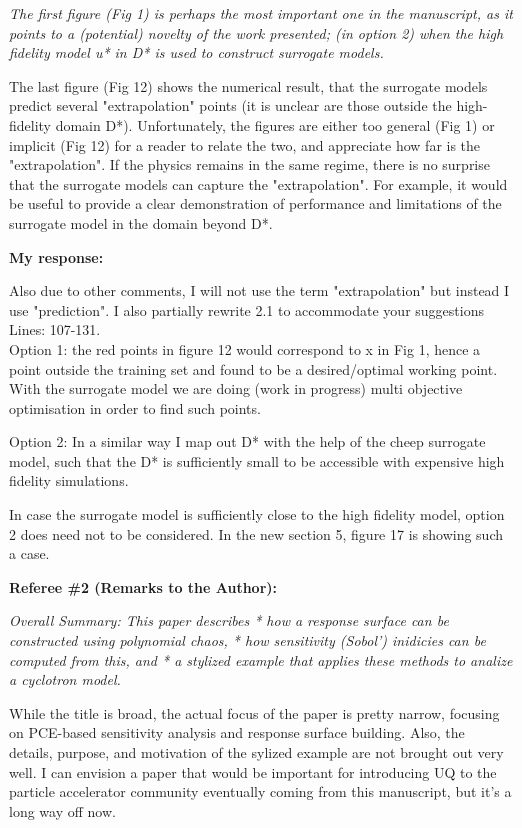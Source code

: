 \documentclass{article}
\newcommand{\atline}[1]{\color{red} Lines: #1\color{blue}}
\begin{document}
{\it  The first figure (Fig 1) is perhaps the most important one in the manuscript, as it points to a (potential) novelty of the work presented; (in option 2) when the high fidelity model u* in D* is used to construct surrogate models. 

The last figure (Fig 12) shows the numerical result, that the surrogate models predict several "extrapolation" points (it is unclear are those outside the high-fidelity domain D*). Unfortunately, the figures are either too general (Fig 1) or implicit (Fig 12) for a reader to relate the two, and appreciate how far is the "extrapolation". If the physics remains in the same regime, there is no surprise that the surrogate models can capture the "extrapolation". For example, it would be useful to provide a clear demonstration of performance and limitations of the surrogate model in the domain beyond D*. }

{\bf My response: }{\color{blue}  Also due to other comments, I will not use the term "extrapolation" but instead I use "prediction". I also partially rewrite 2.1 to accommodate your suggestions \atline{107-131}. \\


Option 1: the red points in figure 12 would correspond to x in Fig 1, hence a point outside the training set and found to be a desired/optimal working point. With the surrogate model
we are doing (work in progress) multi objective optimisation in order to find such points.

Option 2: In a similar way I map out D* with the help of the cheep surrogate model, such that the D* is sufficiently small to be accessible with expensive high fidelity simulations. 

In case the surrogate model is sufficiently close to the high fidelity model, option 2 does need not to be considered. In the new section 5, figure 17 is showing such a case. 



} 



{\bf Referee \#2 (Remarks to the Author): }

{\it Overall Summary: 
This paper describes 
* how a response surface can be constructed using polynomial chaos, 
* how sensitivity (Sobol') inidicies can be computed from this, and 
* a stylized example that applies these methods to analize a cyclotron 
model.

While the title is broad, the actual focus of the paper is pretty narrow, 
focusing on PCE-based sensitivity analysis and response surface 
building. Also, the details, purpose, and motivation of the sylized 
example are not brought out very well. I can envision a paper that would 
be important for introducing UQ to the particle accelerator community 
eventually coming from this manuscript, but it's a long way off now. 
}
\end{document}
